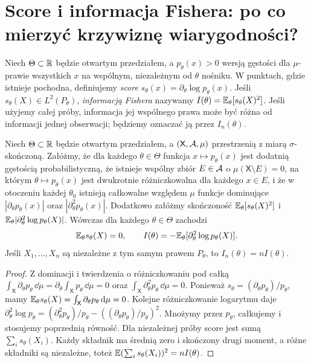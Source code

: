 \section{Score i informacja Fishera: po co mierzyć krzywiznę wiarygodności?}
\begin{definicja}\label{def:score-fisher}
Niech $\Theta\subset\mathbb R$ będzie otwartym przedziałem, a $p_\theta(x)>0$
wersją gęstości dla $\mu$-prawie wszystkich $x$ na wspólnym, niezależnym od
$\theta$ nośniku. W punktach, gdzie istnieje pochodna, definiujemy
\emph{score} $s_\theta(x)=\partial_\theta\log p_\theta(x)$.
Jeśli $s_\theta(X)\in L^2(P_\theta)$, \emph{informacją Fishera} nazywamy
$I(\theta)=\mathbb E_\theta[s_\theta(X)^2]$.
Jeśli użyjemy całej próby, informacja jej wspólnego prawa może być różna
od informacji jednej obserwacji; będziemy oznaczać ją przez $I_n(\theta)$.
\end{definicja}

\begin{twierdzenie}\label{thm:fisher-identities}
Niech $\Theta\subset\mathbb R$ będzie otwartym przedziałem, a $(\mathsf X,\mathcal A,\mu)$
przestrzenią z miarą $\sigma$-skończoną. Załóżmy, że dla każdego
$\theta\in\Theta$ funkcja $x\mapsto p_\theta(x)$ jest dodatnią gęstością
probabilistyczną, że istnieje wspólny zbiór $E\in\mathcal A$ o $\mu(\mathsf X\setminus E)=0$,
na którym $\theta\mapsto p_\theta(x)$ jest dwukrotnie
różniczkowalna dla każdego $x\in E$, i że w otoczeniu każdej
$\theta_0$ istnieją całkowalne względem $\mu$ funkcje dominujące
$|\partial_\theta p_\theta(x)|$ oraz $|\partial^2_\theta p_\theta(x)|$.
Dodatkowo załóżmy skończoność $\mathbb E_\theta[s_\theta(X)^2]$ i
$\mathbb E_\theta|\partial_\theta^2\log p_\theta(X)|$.
Wówczas dla każdego $\theta\in\Theta$ zachodzi
\[
\mathbb E_\theta s_\theta(X)=0,\qquad
I(\theta)=-\mathbb E_\theta[\partial_\theta^2\log p_\theta(X)].
\]
Jeśli $X_1,\ldots,X_n$ są niezależne z tym samym prawem $P_\theta$,
to $I_n(\theta)=nI(\theta)$.
\end{twierdzenie}
\begin{proof}
Z dominacji i twierdzenia o różniczkowaniu pod całką
$\int_{\mathsf X}\partial_\theta p_\theta\,\dd\mu
=\partial_\theta\int_{\mathsf X}p_\theta\,\dd\mu=0$ oraz
$\int_{\mathsf X}\partial_\theta^2p_\theta\,\dd\mu=0$.
Ponieważ $s_\theta=(\partial_\theta p_\theta)/p_\theta$, mamy
$\mathbb E_\theta s_\theta(X)=\int_{\mathsf X}\partial_\theta p_\theta\,\mathrm d\mu=0$.
Kolejne różniczkowanie logarytmu daje
$\partial_\theta^2\log p_\theta
=(\partial_\theta^2p_\theta)/p_\theta
-((\partial_\theta p_\theta)/p_\theta)^2$.
Mnożymy przez $p_\theta$, całkujemy i stosujemy poprzednią równość.
Dla niezależnej próby score jest sumą $\sum_i s_\theta(X_i)$.
Każdy składnik ma średnią zero i skończony drugi moment, a różne składniki
są niezależne, toteż $\mathbb E(\sum_i s_\theta(X_i))^2=nI(\theta)$.
\end{proof}

